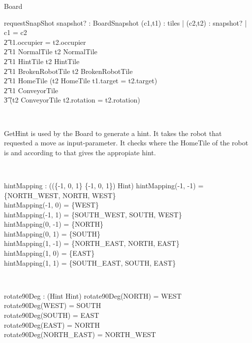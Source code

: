 \documentclass[12pt]{article}
\begin{document}
\begin{class}{Board}
\begin{schema}{requestSnapShot}
snapshot? : BoardSnapshot
\where
\forall (c1,t1) : tiles | \exists (c2,t2) : snapshot? | c1 = c2 \: \wedge \\ \t2
t1.occupier = t2.occupier \: \wedge \\ \t2
t1 \in NormalTile \Rightarrow t2 \in NormalTile \: \wedge \\ \t2
t1 \in HintTile \Rightarrow t2 \in HintTile \: \wedge \\ \t2
t1 \in BrokenRobotTile \Rightarrow t2 \in BrokenRobotTile \: \wedge \\ \t2
t1 \in HomeTile \Rightarrow (t2 \in HomeTile \wedge t1.target = t2.target) \: \wedge \\ \t2
t1 \in ConveyorTile \Rightarrow \\ \t3 (t2 \in ConveyorTile \wedge t2.rotation = t2.rotation)
\end{schema} \\
\znewpage
\begin{classcom}
GetHint is used by the Board to generate a hint. It takes the robot that requested a move as input-parameter. It checks where the HomeTile of the robot is and according to that gives the appropiate hint.
\end{classcom} \\
\begin{axdef}
hintMapping : \power ((\{-1, 0, 1\} \cross \{-1, 0, 1\}) \pfun \power Hint)
\where
hintMapping(-1, -1) = \{NORTH\_WEST, NORTH, WEST\} \\
hintMapping(-1, 0) = \{WEST\} \\
hintMapping(-1, 1) = \{SOUTH\_WEST, SOUTH, WEST\} \\
hintMapping(0, -1) = \{NORTH\} \\
hintMapping(0, 1) = \{SOUTH\} \\
hintMapping(1, -1) = \{NORTH\_EAST, NORTH, EAST\} \\
hintMapping(1, 0) = \{EAST\} \\
hintMapping(1, 1) = \{SOUTH\_EAST, SOUTH, EAST\} \\
\end{axdef} \\
\begin{axdef}
rotate90Deg : \power (Hint \fun Hint)
\where
rotate90Deg(NORTH) = WEST \\
rotate90Deg(WEST) = SOUTH \\
rotate90Deg(SOUTH) = EAST \\
rotate90Deg(EAST) = NORTH \\
rotate90Deg(NORTH\_EAST) = NORTH\_WEST \\

\end{axdef}
\end{class}
\end{document}
